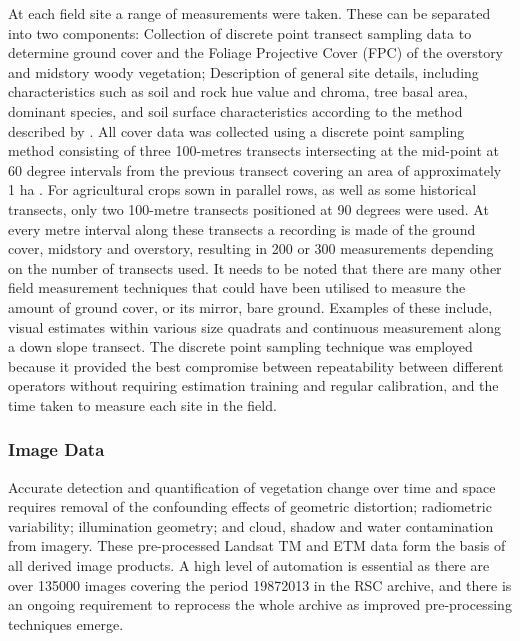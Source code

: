 \documentclass[remotesensing,article,accept,moreauthors,pdftex,12pt,a4paper]{mdpi}
\begin{document}
At each field site a range of measurements were taken. These can be separated into two components: Collection of discrete point transect sampling data to determine ground cover and the Foliage Projective Cover (FPC) of the overstory and midstory woody vegetation; Description of general site details, including characteristics such as soil and rock hue value and chroma, tree basal area, dominant species, and soil surface characteristics according to the method described by \citep{Muir2011}.
All cover data was collected using a discrete point sampling method consisting of  three 100-metres transects intersecting at the mid-point at 60 degree intervals from the previous transect covering an area of approximately 1 ha \citep{Muir2011}. For agricultural crops sown in parallel rows, as well as some historical transects, only two 100-metre transects positioned at 90 degrees were used. At every metre interval along these transects a recording is made of the ground cover, midstory and overstory, resulting in 200 or 300 measurements depending on the number of transects used. 
It needs to be noted that there are many other field measurement techniques that could have been utilised to measure the amount of ground cover, or its mirror, bare ground. Examples of these include, visual estimates within various size quadrats and continuous measurement along a down slope transect. The discrete point sampling technique was employed because it provided the best compromise between repeatability between different operators without requiring estimation training and regular calibration, and the time taken to measure each site in the field. 

%
%
%
%
%
%

\subsubsection{Image Data}

Accurate detection and quantification of vegetation change over time and space requires removal of the confounding effects of geometric distortion; radiometric variability; illumination geometry; and cloud, shadow and water contamination from imagery. These pre-processed Landsat TM and ETM data form the basis of all derived image products. A high level of automation is essential as there are over 135000 images covering the period 1987\textendash{}2013 in the RSC archive, and there is an ongoing requirement to reprocess the whole archive as improved pre-processing techniques emerge. 
%
%
\end{document}
